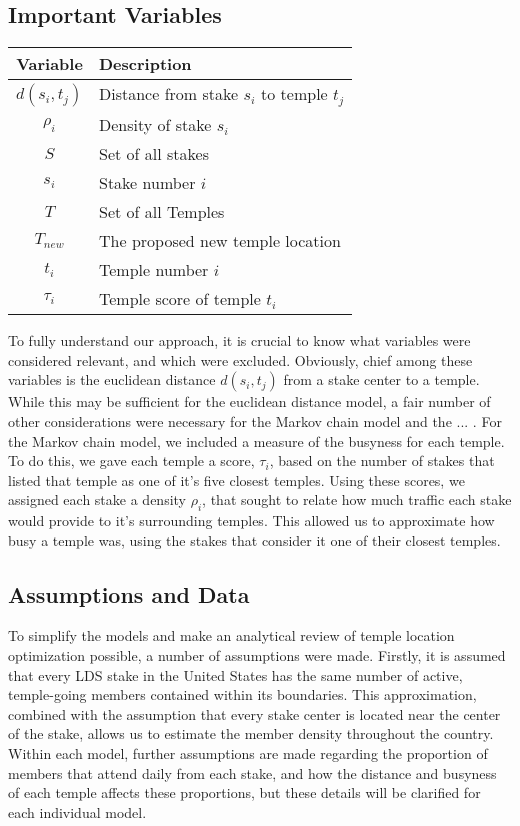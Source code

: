 \documentclass[twoside,twocolumn]{article}
\begin{document}
\subsection{Important Variables}
\begin{tabular}{c | l}
Variable & Description\\
\hline
$d(s_{i},t_{j})$ & Distance from stake $s_{i}$ to temple $t_{j}$\\
$\rho_{i}$ & Density of stake $s_{i}$\\
$S$ & Set of all stakes\\
$s_{i}$ & Stake number $i$\\
$T$ & Set of all Temples\\
$T_{new}$ & The proposed new temple location\\
$t_{i}$ & Temple number $i$ \\
$\tau_{i}$ & Temple score of temple $t_{i}$\\
\end{tabular}
\vspace{0.1in}

\noindent To fully understand our approach, it is crucial to know what variables were considered relevant, and which were excluded.
Obviously, chief among these variables is the euclidean distance $d(s_{i},t_{j})$ from a stake center to a temple.
While this may be sufficient for the euclidean distance model, a fair number of other considerations were necessary for the Markov chain model and the ... .
For the Markov chain model, we included a measure of the busyness for each temple.
To do this, we gave each temple a score, $\tau_{i}$, based on the number of stakes that listed that temple as one of it's five closest temples.
Using these scores, we assigned each stake a density $\rho_{i}$, that sought to relate how much traffic each stake would provide to it's surrounding temples.
This allowed us to approximate how busy a temple was, using the stakes that consider it one of their closest temples.

\subsection{Assumptions and Data}
To simplify the models and make an analytical review of temple location optimization possible, a number of assumptions were made. Firstly, it is assumed that every LDS stake in the United States has the same number of active, temple-going members contained within its boundaries. This approximation, combined with the assumption that every stake center is located near the center of the stake, allows us to estimate the member density throughout the country. Within each model, further assumptions are made regarding the proportion of members that attend daily from each stake, and how the distance and busyness of each temple affects these proportions, but these details will be clarified for each individual model.
\end{document}
